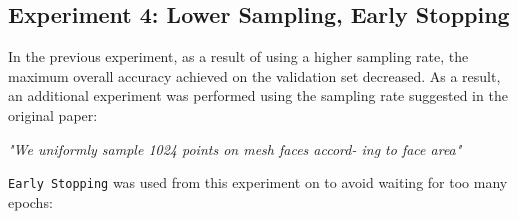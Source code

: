 \documentclass[11pt,a4paper]{article}
\begin{document}
\subsection{Experiment 4: Lower Sampling, Early Stopping}
In the previous experiment, as a result of using a higher sampling rate, the maximum overall accuracy achieved on the validation set decreased. As a result, an additional experiment was performed using the sampling rate suggested in the original paper:
\begin{displayquote}
\textit{"We uniformly sample 1024 points on mesh faces accord- ing to face area"}
\end{displayquote}
\texttt{Early Stopping} was used from this experiment on to avoid waiting for too many epochs:
\begin{figure}[H]
    \centering
    \qquad

\end{figure}
\end{document}

